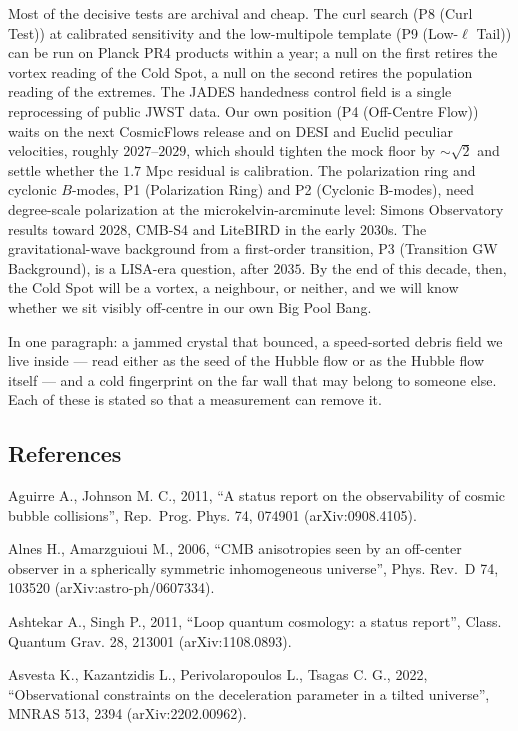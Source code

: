 \documentclass[
]{article}
\begin{document}
Most of the decisive tests are archival and cheap. The curl search (P8
(Curl Test)) at calibrated sensitivity and the low-multipole template
(P9 (Low-\(\ell\) Tail)) can be run on Planck PR4 products within a
year; a null on the first retires the vortex reading of the Cold Spot, a
null on the second retires the population reading of the extremes. The
JADES handedness control field is a single reprocessing of public JWST
data. Our own position (P4 (Off-Centre Flow)) waits on the next
CosmicFlows release and on DESI and Euclid peculiar velocities, roughly
\(2027\)--\(2029\), which should tighten the mock floor by
\(\sim\!\sqrt{2}\) and settle whether the \(1.7\) Mpc residual is
calibration. The polarization ring and cyclonic \(B\)-modes, P1
(Polarization Ring) and P2 (Cyclonic B-modes), need degree-scale
polarization at the microkelvin-arcminute level: Simons Observatory
results toward \(2028\), CMB-S4 and LiteBIRD in the early \(2030\)s. The
gravitational-wave background from a first-order transition, P3
(Transition GW Background), is a LISA-era question, after \(2035\). By
the end of this decade, then, the Cold Spot will be a vortex, a
neighbour, or neither, and we will know whether we sit visibly
off-centre in our own Big Pool Bang.

In one paragraph: a jammed crystal that bounced, a speed-sorted debris
field we live inside --- read either as the seed of the Hubble flow or
as the Hubble flow itself --- and a cold fingerprint on the far wall
that may belong to someone else. Each of these is stated so that a
measurement can remove it.

\hypertarget{references}{%
\subsection{\texorpdfstring{\textbf{References}}{References}}\label{references}}

Aguirre A., Johnson M. C., 2011, ``A status report on the observability
of cosmic bubble collisions'', Rep.~Prog. Phys. 74, 074901
(arXiv:0908.4105).

Alnes H., Amarzguioui M., 2006, ``CMB anisotropies seen by an off-center
observer in a spherically symmetric inhomogeneous universe'', Phys.
Rev.~D 74, 103520 (arXiv:astro-ph/0607334).

Ashtekar A., Singh P., 2011, ``Loop quantum cosmology: a status
report'', Class. Quantum Grav. 28, 213001 (arXiv:1108.0893).

Asvesta K., Kazantzidis L., Perivolaropoulos L., Tsagas C. G., 2022,
``Observational constraints on the deceleration parameter in a tilted
universe'', MNRAS 513, 2394 (arXiv:2202.00962).
\end{document}
